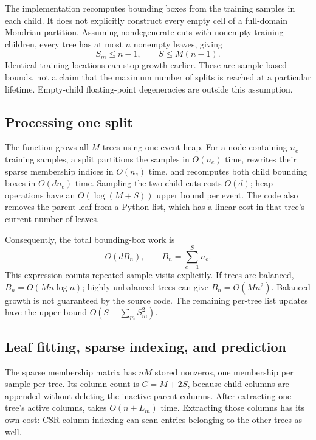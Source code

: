 \documentclass[11pt]{article}
\newcommand{\code}[1]{\texttt{\detokenize{#1}}}
\begin{document}
The implementation recomputes bounding boxes from the training samples in each child. It does not explicitly construct every empty cell of a full-domain Mondrian partition. Assuming nondegenerate cuts with nonempty training children, every tree has at most $n$ nonempty leaves, giving
\begin{equation}
S_m\leq n-1,\qquad S\leq M(n-1).
\end{equation}
Identical training locations can stop growth earlier. These are sample-based bounds, not a claim that the maximum number of splits is reached at a particular lifetime. Empty-child floating-point degeneracies are outside this assumption.

\subsection{Processing one split}

The function \code{train} grows all $M$ trees using one event heap. For a node containing $n_e$ training samples, a split partitions the samples in $O(n_e)$ time, rewrites their sparse membership indices in $O(n_e)$ time, and recomputes both child bounding boxes in $O(dn_e)$ time. Sampling the two child cuts costs $O(d)$; heap operations have an $O(\log(M+S))$ upper bound per event. The code also removes the parent leaf from a Python list, which has a linear cost in that tree's current number of leaves.

Consequently, the total bounding-box work is
\begin{equation}
O(dB_n),\qquad B_n=\sum_{e=1}^{S} n_e.
\end{equation}
This expression counts repeated sample visits explicitly. If trees are balanced, $B_n=O(Mn\log n)$; highly unbalanced trees can give $B_n=O(Mn^2)$. Balanced growth is not guaranteed by the source code. The remaining per-tree list updates have the upper bound $O(S+\sum_m S_m^2)$.

\subsection{Leaf fitting, sparse indexing, and prediction}

The sparse membership matrix has $nM$ stored nonzeros, one membership per sample per tree. Its column count is $C=M+2S$, because child columns are appended without deleting the inactive parent columns. After extracting one tree's active columns, \code{_leaf_weights} takes $O(n+L_m)$ time. Extracting those columns has its own cost: CSR column indexing can scan entries belonging to the other trees as well.
\end{document}
